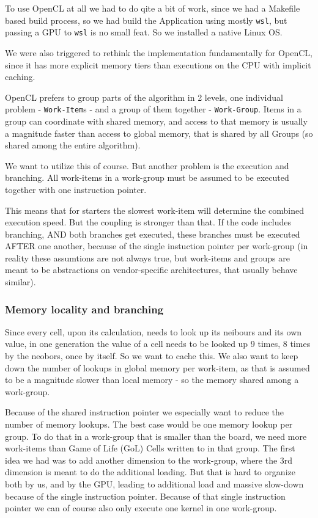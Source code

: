\documentclass[a4paper,english,12pt,twoside=false]{scrartcl} %
\begin{document}
To use OpenCL at all we had to do qite a bit of work, since we had a Makefile based build process,
so we had build the Application using mostly \verb|wsl|, but passing a GPU to \verb|wsl| is no small feat. 
So we installed a native Linux OS.

We were also triggered to rethink the implementation fundamentally for OpenCL, 
since it has more explicit memory tiers than executions on the CPU with implicit caching.

OpenCL prefers to group parts of the algorithm in 2 levels, one individual problem - \verb|Work-Item|s - 
and a group of them together - \verb|Work-Group|. Items in a group can coordinate with shared memory, 
and access to that memory is usually a magnitude faster than access to global memory, 
that is shared by all Groups (so shared among the entire algorithm).

We want to utilize this of course. But another problem is the execution and branching. 
All work-items in a work-group must be assumed to be executed together with one instruction pointer.

This means that for starters the slowest work-item will determine the combined execution speed. 
But the coupling is stronger than that. If the code includes branching, AND both branches get executed,
these branches must be executed AFTER one another, because of the single instuction pointer per work-group 
(in reality these assumtions are not always true, but work-items and groups are meant to be abstractions on 
vendor-specific architectures, that usually behave similar).

\subsubsection{Memory locality and branching}

Since every cell, upon its calculation, needs to look up its neibours and its own value, in one generation the value of 
a cell needs to be looked up 9 times, 8 times by the neobors, once by itself. So we want to cache this.
We also want to keep down the number of lookups in global memory per work-item, as that is assumed to be a magnitude slower 
than local memory - so the memory shared among a work-group.

Because of the shared instruction pointer we especially want to reduce the number of memory lookups. 
The best case would be one memory lookup per group.
To do that in a work-group that is smaller than the board, we need more work-items than Game of Life (GoL) Cells written to in that group.
The first idea we had was to add another dimension to the work-group, where the 3rd dimension is meant to do the additional loading. 
But that is hard to organize both by us, and by the GPU, leading to additional load and massive slow-down because of the single instruction pointer.
Because of that single instruction pointer we can of course also only execute one kernel in one work-group.
\end{document}
